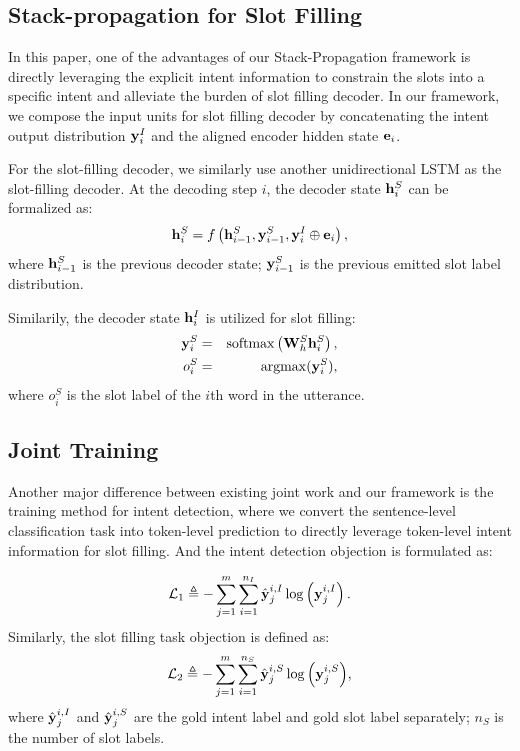 \documentclass[11pt,a4paper]{article}
\begin{document}
\subsection{Stack-propagation for Slot Filling}
In this paper, one of the advantages of our Stack-Propagation framework is directly
leveraging the explicit intent information to constrain the slots into a specific intent and alleviate the burden of slot filling decoder.
In our framework,
we compose the input units for slot filling decoder by 
concatenating the intent output distribution ${\bf{y}} _ { i } ^ { I } $ 
and the aligned encoder hidden state ${\bf{e}}_{i}$.

For the slot-filling decoder, we similarly use 
another unidirectional LSTM as the slot-filling decoder. 
At the decoding step $i$, the decoder state ${\bf{h}}_{i}^{S}$ 
can be formalized as:
\begin{equation}
{\bf{h}} _ { i }^{S} = f \left( {\bf{h}} _ { i - 1 }^{S} , {\bf{y}} _ { i - 1 }^{S} ,  {\bf{y}} _ { i } ^ { I } \oplus{{\bf{e}} _ { i }}\right),
\end{equation}
where ${\bf{h}}_{i-1}^{S}$ is the previous decoder state;  
${\bf{y}}_{i-1}^{S}$ is the previous emitted slot label distribution.

Similarily, the decoder state ${\bf{h}}_{i}^
{I}$ is utilized for slot filling:
\begin{eqnarray}
{\bf{y}} _ { i } ^ { S } &=& \operatorname { softmax } \left( {\bf{W}} _ { h } ^ { S } {\bf{h}}_ { i }^{S}\right),\\
{o} _ { i } ^ { S } &=& \operatorname { argmax } ({\bf{y}} _ { i } ^ { S }),
\end{eqnarray}
where ${o} _ { i } ^ { S }$ is the slot label of the $i$th word in the utterance.
\subsection{Joint Training}
Another major difference between existing joint work \cite{zhang2016joint, goo2018slot} and our framework is the training method for intent detection,
where we convert
the sentence-level classification task into
token-level prediction to directly leverage
token-level intent information for slot filling.
And the intent detection objection is formulated as:

\begin{equation}
\mathcal { L } _ { 1 } \triangleq - \sum _ { j = 1 } ^ { m } \sum _ { i = 1 } ^ { n_{I} }  \hat { {\bf{y}} } _ { j } ^ { i,I } \log \left( {\bf{y}} _ { j } ^ {  i,I } \right).
\end{equation}
Similarly, the slot filling task objection is defined as: 
\begin{equation}
\mathcal { L } _ { 2 } \triangleq - \sum _ { j = 1 } ^ { m } \sum _ { i = 1 } ^ { n_{S} } { \hat { {\bf{y}} } _ { j } ^ { i, S } \log \left( {\bf{y}} _ { j } ^ { i,S } \right)},
\end{equation}
where ${\hat { {\bf{y}} } _ { j } ^ { i,I } }$ and 
$ {\hat { {\bf{y}}} _ { j } ^ { i,S } }$ are the gold intent label and 
gold slot label separately; $n_{S}$ is the number of slot labels.
\end{document}
